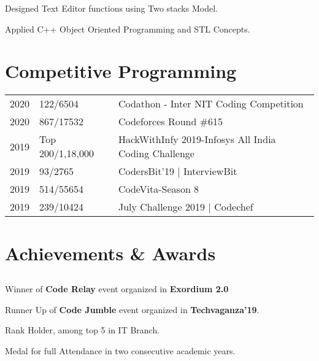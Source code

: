 \documentclass[]{deedy-resume-openfont}
\begin{document}
\begin{minipage}[t]{0.66\textwidth}
\descript{}
\begin{tightemize}
\item Designed Text Editor functions using Two stacks Model.
\item Applied C++ Object Oriented Programming and STL Concepts.
\end{tightemize}
\sectionsep


\section{Competitive Programming} 
\begin{tabular}{rll}
2020	     & 122/6504  & Codathon - Inter NIT Coding Competition\\
2020         & 867/17532  & Codeforces Round \#615 \\
2019	     & Top 200/1,18,000  & HackWithInfy 2019-Infosys All India Coding Challenge\\
2019	     &93/2765   & CodersBit'19 | InterviewBit\\
2019         & 514/55654 & CodeVita-Season 8  \\
2019         & 239/10424 &  July Challenge 2019 | Codechef\\
\end{tabular}
\sectionsep


\section{Achievements \& Awards} 
\subsection{}
\begin{tightemize}
\item  Winner of \textbf{Code Relay} event organized in \textbf{Exordium 2.0}
\item  Runner Up of \textbf{Code Jumble} event organized in \textbf{Techvaganza'19}.
\item Rank Holder, among top 5 in IT Branch.
\item Medal for full Attendance in two consecutive academic years.
\end{tightemize}
\end{minipage} 
\end{document}
